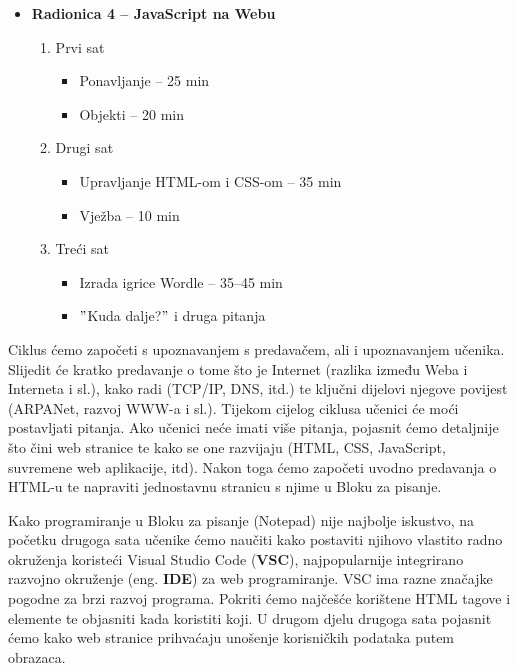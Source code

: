 \begin{itemize}
\begin{enumerate}
        \end{enumerate}
    \item \textbf{Radionica 4 -- JavaScript na Webu}
        \begin{enumerate}
            \item Prvi sat
                \begin{itemize}
                    \item Ponavljanje -- 25 min
                    \item Objekti -- 20 min
                \end{itemize}
            \item Drugi sat
                \begin{itemize}
                    \item Upravljanje HTML-om i CSS-om -- 35 min
                    \item Vježba -- 10 min
                \end{itemize}
            \item Treći sat
                \begin{itemize}
                    \item Izrada igrice Wordle -- 35--45 min
                    \item \("\)Kuda dalje?\("\) i druga pitanja
                \end{itemize}
        \end{enumerate}
\end{itemize}

Ciklus ćemo započeti s upoznavanjem s predavačem, ali i upoznavanjem učenika.
Slijedit će kratko predavanje o tome što je Internet (razlika između Weba i Interneta i sl.), kako radi (TCP/IP, DNS, itd.) te ključni dijelovi njegove povijest (ARPANet, razvoj WWW-a i sl.).
Tijekom cijelog ciklusa učenici će moći postavljati pitanja.
Ako učenici neće imati više pitanja, pojasnit ćemo detaljnije što čini web stranice te kako se one razvijaju (HTML, CSS, JavaScript, suvremene web aplikacije, itd).
Nakon toga ćemo započeti uvodno predavanja o HTML-u te napraviti jednostavnu stranicu s njime u Bloku za pisanje.

Kako programiranje u Bloku za pisanje (Notepad) nije najbolje iskustvo, na početku drugoga sata učenike ćemo naučiti kako postaviti njihovo vlastito radno okruženja koristeći Visual Studio Code (\textbf{VSC}), najpopularnije integrirano razvojno okruženje (eng. \textbf{IDE}) za web programiranje.
VSC ima razne značajke pogodne za brzi razvoj programa.
Pokriti ćemo najčešće korištene HTML tagove i elemente te objasniti kada koristiti koji.
U drugom djelu drugoga sata pojasnit ćemo kako web stranice prihvaćaju unošenje korisničkih podataka putem obrazaca.

